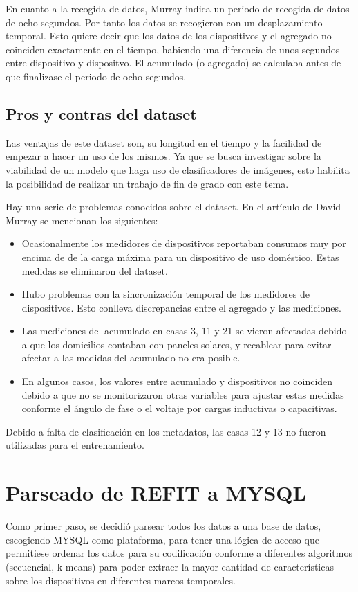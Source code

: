 En cuanto a la recogida de datos, Murray indica un periodo de recogida de datos de ocho segundos. Por tanto los datos se recogieron con un desplazamiento temporal. Esto quiere decir que los datos de los dispositivos y el agregado no coinciden exactamente en el tiempo, habiendo una diferencia de unos segundos entre dispositivo y dispositvo. El acumulado (o agregado) se calculaba antes de que finalizase el periodo de ocho segundos.

\subsection{Pros y contras del dataset}

Las ventajas de este dataset son, su longitud en el tiempo y la facilidad de empezar a hacer un uso de los mismos. Ya que se busca investigar sobre la viabilidad de un modelo que haga uso de clasificadores de imágenes, esto habilita la posibilidad de realizar un trabajo de fin de grado con este tema. 

Hay una serie de problemas conocidos sobre el dataset. En el artículo de David Murray \autocite{REFIT} se mencionan los siguientes:
\begin{itemize}
    \item Ocasionalmente los medidores de dispositivos reportaban consumos muy por encima de de la carga máxima para un dispositivo de uso doméstico. Estas medidas se eliminaron del dataset.
    \item Hubo problemas con la sincronización temporal de los medidores de dispositivos. Esto conlleva discrepancias entre el agregado y las mediciones.
    \item Las mediciones del acumulado en casas 3, 11 y 21 se vieron afectadas debido a que los domicilios contaban con paneles solares, y recablear para evitar afectar a las medidas del acumulado no era posible.
    \item En algunos casos, los valores entre acumulado y dispositivos no coinciden debido a que no se monitorizaron otras variables para ajustar estas medidas conforme el ángulo de fase o el voltaje por cargas inductivas o capacitivas.
\end{itemize}

Debido a falta de clasificación en los metadatos, las casas 12 y 13 no fueron utilizadas para el entrenamiento.

\section{Parseado de REFIT a MYSQL}
Como primer paso, se decidió parsear todos los datos a una base de datos, escogiendo MYSQL como plataforma, para tener una lógica de acceso que permitiese ordenar los datos para su codificación conforme a diferentes algoritmos (secuencial, k-means) para poder extraer la mayor cantidad de características sobre los dispositivos en diferentes marcos temporales.


